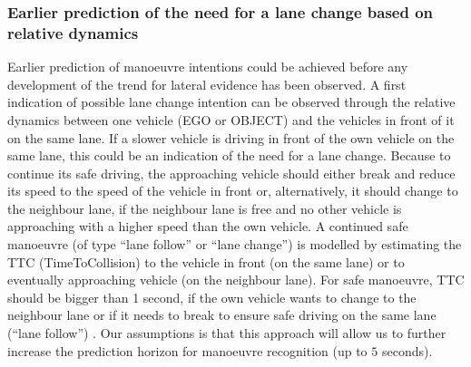 
\subsubsection{Earlier prediction of the need for a lane change based on relative dynamics}

Earlier prediction of manoeuvre intentions could be achieved before any development of the trend for lateral evidence has been observed. A first indication of possible lane change intention can be observed through the relative dynamics between one vehicle (EGO or OBJECT) and the vehicles in front of it on the same lane. If a slower vehicle is driving in front of the own vehicle on the same lane, this could be an indication of the need for a lane change. Because to continue its safe driving, the approaching vehicle should either break and reduce its speed to the speed of the vehicle in front or, alternatively, it should change to the neighbour lane, if the neighbour lane is free and no other vehicle is approaching with a higher speed than the own vehicle. A continued safe manoeuvre (of type ``lane follow'' or ``lane change'') is modelled by estimating the TTC (TimeToCollision) to the vehicle in front (on the same lane) or to eventually approaching vehicle (on the neighbour lane). For safe manoeuvre, TTC should be bigger than 1 second, if the own vehicle wants to change to the neighbour lane or if it needs to break to ensure safe driving on the same lane (``lane follow'') . Our assumptions is that this approach will allow us to further increase the prediction horizon for manoeuvre recognition (up to $5$ seconds).

